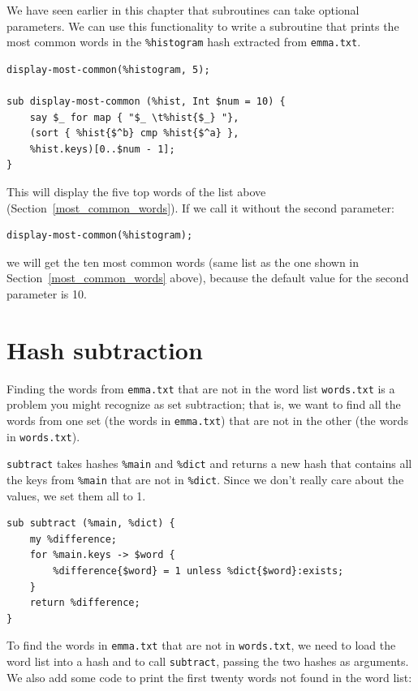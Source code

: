 We have seen earlier in this chapter that subroutines can 
take optional parameters. We can use this functionality to 
write a subroutine that prints the most common words in the 
\verb'%histogram' hash extracted from \verb'emma.txt'.

\begin{verbatim}
display-most-common(%histogram, 5);

sub display-most-common (%hist, Int $num = 10) {
    say $_ for map { "$_ \t%hist{$_} "}, 
    (sort { %hist{$^b} cmp %hist{$^a} },
    %hist.keys)[0..$num - 1];
}
\end{verbatim}

This will display the five top words of the list above 
(Section~\ref{most_common_words}). If we call it without 
the second parameter:

\begin{verbatim}
display-most-common(%histogram);
\end{verbatim}

we will get the ten most common words (same list as the one 
shown in Section~\ref{most_common_words} above), because 
the default value for the second parameter is 10.


\section{Hash subtraction}
\label{hashsub}

Finding the words from \verb'emma.txt' that are not in the word list
{\tt words.txt} is a problem you might recognize as set
subtraction; that is, we want to find all the words from one
set (the words in \verb'emma.txt') that are not in the other (the
words in \verb'words.txt').

{\tt subtract} takes hashes \verb'%main' and \verb'%dict' and 
returns a new hash that contains all the keys from \verb'%main' 
that are not in \verb'%dict'.  Since we don't really care about 
the values, we set them all to 1.

\begin{verbatim}
sub subtract (%main, %dict) {
	my %difference;
	for %main.keys -> $word {
		%difference{$word} = 1 unless %dict{$word}:exists;
	}
	return %difference;
}
\end{verbatim}
%
To find the words in \verb'emma.txt' that are not in {\tt words.txt},
we need to load the word list into a hash and to call 
{\tt subtract}, passing the two hashes as arguments. We also 
add some code to print the first twenty words not found in the 
word list:

